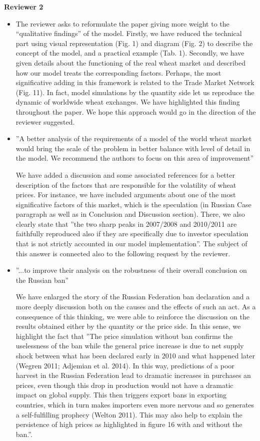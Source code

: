 \documentclass[a4paper,12pt]{article}
\begin{document}
\vskip1cm
\textbf{Reviewer 2}
\begin{itemize}
	\item The reviewer asks to reformulate the paper giving more weight to the ``qualitative findings'' of the model.
    Firstly, we have reduced the technical part using visual representation (Fig. 1) and diagram (Fig. 2) to describe the concept of the model, and a practical example (Tab. 1). Secondly, we have given details about the functioning of the real wheat market and described how our model treats the corresponding factors. Perhaps, the most significative adding in this framework is related to the Trade Market Network (Fig. 11). In fact, model simulations by the quantity side let us reproduce the dynamic of worldwide wheat exchanges. We have highlighted this finding throughout the paper. We hope this approach would go in the direction of the reviewer suggested.
    
    \item ''A better analysis of the requirements of a model of the world wheat market would bring the scale of the problem in better balance with level of detail in the model. We recommend the authors to focus on this area of improvement'' 
    
    We have added a discussion and some associated references for a better description of the factors that are responsible for the volatility of wheat prices. For instance, we have included arguments about one of the most significative factors of this market, which is the speculation (in Russian Case paragraph as well as in Conclusion and Discussion section). There, we also clearly state that ''the two sharp peaks in 2007/2008 and 2010/2011 are faithfully reproduced also if they are specifically due to investor speculation that is not strictly accounted in our model implementation''. The subject of this answer is connected also to the following request by the reviewer.
    
    \item ''...to improve their analysis on the robustness of their overall conclusion on the Russian ban''
    
    We have enlarged the story of the Russian Federation ban declaration and a more deeply discussion both on the causes and the effects of such an act. As a consequence of this thinking, we were able to reinforce the discussion on the results obtained either by the quantity or the price side. In this sense, we highlight the fact that  ''The price simulation without ban confirms the uselessness of the ban while the general price increase is due to net supply shock between what has been declared early in 2010 and what happened later (Wegren 2011; Adjemian et al. 2014). In this way, predictions of a poor harvest in the Russian Federation lead to dramatic increases in purchases an prices, even though this drop in production would not have a dramatic impact on global supply. This then triggers export bans in exporting countries, which in turn makes importers even more nervous and so generates a self-fulfilling prophecy (Welton 2011). This may also help to explain the persistence of high prices as highlighted in figure 16 with and without the ban.''. 

	
\end{itemize}
\end{document}
